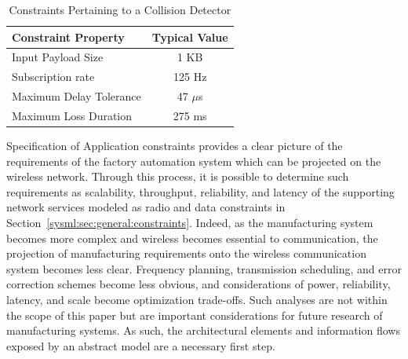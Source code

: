
\begin{table}[tbp]
	\centering
	\caption{Constraints Pertaining to a Collision Detector} \label{tab:sample:constraints}
	\begin{tabular}{lc}
		
		\textbf{Constraint Property} &
		\textbf{Typical Value}
		\\
		\midrule
		Input Payload Size &
		1 KB
		\\
		Subscription rate &
		125 Hz
		\\
		Maximum Delay Tolerance &
		47 $\mu$s
		\\
		Maximum Loss Duration &
		275 ms
		\\
	\end{tabular}%
	
\end{table}

Specification of Application constraints provides a clear picture of the requirements of the factory automation system which can be projected on the wireless network. Through this process, it is possible to determine such requirements as scalability, throughput, reliability, and latency of the supporting network services modeled as radio and data constraints in Section~\ref{sysml:sec:general:constraints}. Indeed, as the manufacturing system becomes more complex and wireless becomes essential to communication, the projection of manufacturing requirements onto the wireless communication system becomes less clear.  Frequency planning, transmission scheduling, and error correction schemes become less obvious, and considerations of power, reliability, latency, and scale become optimization trade-offs. Such analyses are not within the scope of this paper but are important considerations for future research of manufacturing systems.  As such, the architectural elements and information flows exposed by an abstract model are a necessary first step.

